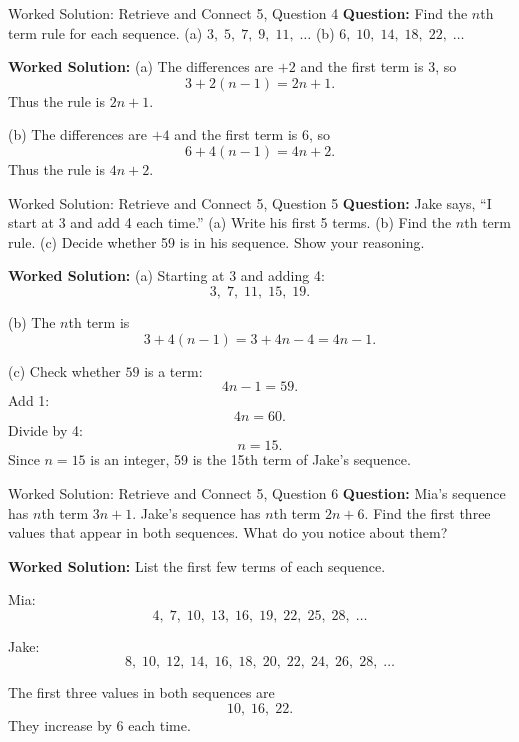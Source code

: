 \documentclass{beamer}
\begin{document}
\begin{frame}{Worked Solution: Retrieve and Connect 5, Question 4}
\textbf{Question:} Find the $n$th term rule for each sequence.  
(a) $3,\;5,\;7,\;9,\;11,\;\ldots$  
(b) $6,\;10,\;14,\;18,\;22,\;\ldots$

\textbf{Worked Solution:}  
(a) The differences are $+2$ and the first term is 3, so
\[
3+2(n-1)=2n+1.
\]
Thus the rule is $2n+1$.

(b) The differences are $+4$ and the first term is 6, so
\[
6+4(n-1)=4n+2.
\]
Thus the rule is $4n+2$.
\end{frame}

\begin{frame}{Worked Solution: Retrieve and Connect 5, Question 5}
\textbf{Question:} Jake says, ``I start at 3 and add 4 each time.'' (a) Write his first 5 terms. (b) Find the $n$th term rule. (c) Decide whether 59 is in his sequence. Show your reasoning.

\textbf{Worked Solution:}  
(a) Starting at 3 and adding 4:
\[
3,\;7,\;11,\;15,\;19.
\]

(b) The $n$th term is
\[
3+4(n-1)=3+4n-4=4n-1.
\]

(c) Check whether $59$ is a term:
\[
4n-1=59.
\]
Add 1:
\[
4n=60.
\]
Divide by 4:
\[
n=15.
\]
Since $n=15$ is an integer, 59 is the 15th term of Jake's sequence.
\end{frame}

\begin{frame}{Worked Solution: Retrieve and Connect 5, Question 6}
\textbf{Question:} Mia's sequence has $n$th term $3n+1$. Jake's sequence has $n$th term $2n+6$. Find the first three values that appear in both sequences. What do you notice about them?

\textbf{Worked Solution:} List the first few terms of each sequence.

Mia:
\[
4,\;7,\;10,\;13,\;16,\;19,\;22,\;25,\;28,\;\ldots
\]

Jake:
\[
8,\;10,\;12,\;14,\;16,\;18,\;20,\;22,\;24,\;26,\;28,\;\ldots
\]

The first three values in both sequences are
\[
10,\;16,\;22.
\]
They increase by 6 each time.
\end{frame}
\end{document}
